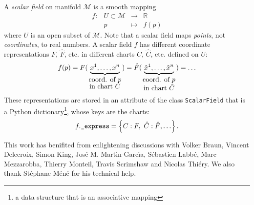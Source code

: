 \documentclass[a4paper]{jpconf}
\newcommand{\code}[1]{\texttt{#1}}
\newcommand{\be}{\begin{equation}}
\newcommand{\ee}{\end{equation}}
\begin{document}
A \emph{scalar field} on manifold $\mathcal{M}$ is a smooth mapping
\be
    \begin{array}{lcll}
    f: & U\subset \mathcal{M}&\longrightarrow &\mathbb{R} \\
       & p & \longmapsto  & f(p)
    \end{array}
\ee
where $U$ is an open subset of $\mathcal{M}$.
Note that a scalar field maps \emph{points}, not \emph{coordinates}, to real numbers. 
A scalar field $f$ has different coordinate representations $F$, $\hat F$, etc. 
in different charts $C$, $\hat C$, etc. defined on $U$:
\be
    f(p) = 
F(\underbrace{x^1,\ldots, x^n}_{\mbox{coord. of $p$}\atop\mbox{in chart $C$}}) 
= {\hat F}(\underbrace{{\hat x}^1,\ldots, {\hat x}^n}_{\mbox{coord. of $p$}\atop\mbox{in chart $\hat C$}})
= \ldots
\ee
These representations are 
stored in an attribute of the class \code{ScalarField} that is a 
Python dictionary\footnote{a data structure that is an associative mapping},
whose keys are the charts:
\be
 f.\mbox{\texttt{\_express}} = \left\{ C: F,\ \hat C: \hat F, \ldots \right\} .
\ee


\ack
This work has benifited from enlightening discussions with Volker Braun,
Vincent Delecroix, Simon King,  Jos\'e M. Mart\'\i n-Garc\'\i a, 
S\'ebastien Labb\'e,
Marc Mezzarobba, Thierry Monteil, Travis Scrimshaw and Nicolas Thi\'ery. 
We also thank St\'ephane M\'en\'e for his technical help. 
 

\end{document}
